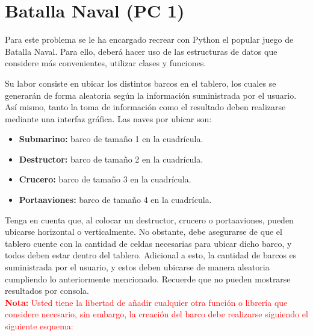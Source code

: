 \section{Batalla Naval (PC 1)}
Para este problema se le ha encargado recrear con Python el popular juego de Batalla Naval. Para ello, deberá hacer uso de las estructuras de datos que considere más convenientes, utilizar clases y funciones. 

Su labor consiste en ubicar los distintos barcos en el tablero, los cuales se generarán de forma aleatoria según la información suministrada por el usuario. Así mismo, tanto la toma de información como el resultado deben realizarse mediante una interfaz gráfica. Las naves por ubicar son:

\begin{itemize}
    \item \textbf{Submarino:} barco de tamaño 1 en la cuadrícula. 
    \item \textbf{Destructor:} barco de tamaño 2 en la cuadrícula. 
    \item \textbf{Crucero:} barco de tamaño 3 en la cuadrícula. 
    \item \textbf{Portaaviones:} barco de tamaño 4 en la cuadrícula.
\end{itemize}

Tenga en cuenta que, al colocar un destructor, crucero o portaaviones, pueden ubicarse horizontal o verticalmente. No obstante, debe asegurarse de que el tablero cuente con la cantidad de celdas necesarias para ubicar dicho barco, y todos deben estar dentro del tablero. Adicional a esto, la cantidad de barcos es suministrada por el usuario, y estos deben ubicarse de manera aleatoria cumpliendo lo anteriormente mencionado. Recuerde que no pueden mostrarse resultados por consola. 
\\

\textcolor{red}{\textbf{Nota:} Usted tiene la libertad de añadir cualquier otra función o librería que considere necesario, sin embargo, la creación del barco debe realizarse siguiendo el siguiente esquema:}

